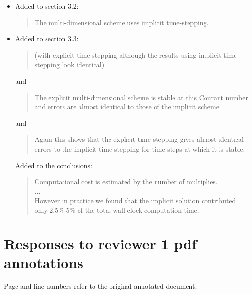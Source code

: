 \documentclass[12pt]{article}
\begin{document}
\begin{description}
\begin{itemize}
\item 
Added to section 3.2:
\begin{quote}
The multi-dimensional scheme uses implicit time-stepping.
\end{quote}

\item 
Added to section 3.3:
\begin{quote}
(with explicit time-stepping although the results using implicit time-stepping look identical)
\end{quote}
and
\begin{quote}
The explicit multi-dimensional scheme is stable at this Courant number and errors are almost identical to those of the implicit scheme.
\end{quote}
and
\begin{quote}
Again this shows that the explicit time-stepping gives almost identical errors to the implicit time-stepping for time-steps at which it is stable.
\end{quote}

Added to the conclusions:
\begin{quote}
Computational cost is estimated by the number of multiplies.\\
...\\
However in practice we found that the implicit solution contributed only 2.5\%-5\% of the total wall-clock computation time.
\end{quote}
\end{itemize}
\end{description}

\section*{Responses to reviewer 1 pdf annotations}

Page and line numbers refer to the original annotated document.
\end{document}
